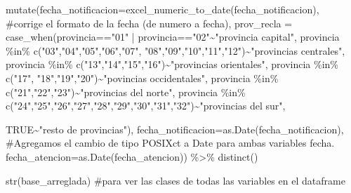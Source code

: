 \documentclass[
  letterpaper,
  DIV=11,
  numbers=noendperiod]{scrreprt}
\newenvironment{Shaded}{\begin{snugshade}}{\end{snugshade}}
\newcommand{\AttributeTok}[1]{\textcolor[rgb]{0.40,0.45,0.13}{#1}}
\newcommand{\CommentTok}[1]{\textcolor[rgb]{0.37,0.37,0.37}{#1}}
\newcommand{\ConstantTok}[1]{\textcolor[rgb]{0.56,0.35,0.01}{#1}}
\newcommand{\FunctionTok}[1]{\textcolor[rgb]{0.28,0.35,0.67}{#1}}
\newcommand{\NormalTok}[1]{\textcolor[rgb]{0.00,0.23,0.31}{#1}}
\newcommand{\SpecialCharTok}[1]{\textcolor[rgb]{0.37,0.37,0.37}{#1}}
\newcommand{\StringTok}[1]{\textcolor[rgb]{0.13,0.47,0.30}{#1}}
\begin{document}
\begin{Shaded}
\begin{Highlighting}[]
  \FunctionTok{mutate}\NormalTok{(}\AttributeTok{fecha\_notificacion=}\FunctionTok{excel\_numeric\_to\_date}\NormalTok{(fecha\_notificacion), }\CommentTok{\#corrige el formato de la fecha (de numero a fecha),}
   \AttributeTok{prov\_recla =} \FunctionTok{case\_when}\NormalTok{(provincia}\SpecialCharTok{==}\StringTok{"01"} \SpecialCharTok{|}\NormalTok{ provincia}\SpecialCharTok{==}\StringTok{"02"}\SpecialCharTok{\textasciitilde{}}\StringTok{"provincia capital"}\NormalTok{,}
\NormalTok{                          provincia }\SpecialCharTok{\%in\%} \FunctionTok{c}\NormalTok{(}\StringTok{"03"}\NormalTok{,}\StringTok{"04"}\NormalTok{,}\StringTok{"05"}\NormalTok{,}\StringTok{"06"}\NormalTok{,}\StringTok{"07"}\NormalTok{,}
                                           \StringTok{"08"}\NormalTok{,}\StringTok{"09"}\NormalTok{,}\StringTok{"10"}\NormalTok{,}\StringTok{"11"}\NormalTok{,}\StringTok{"12"}\NormalTok{)}\SpecialCharTok{\textasciitilde{}}\StringTok{"provincias centrales"}\NormalTok{, }
\NormalTok{                          provincia }\SpecialCharTok{\%in\%} \FunctionTok{c}\NormalTok{(}\StringTok{"13"}\NormalTok{,}\StringTok{"14"}\NormalTok{,}\StringTok{"15"}\NormalTok{,}\StringTok{"16"}\NormalTok{)}\SpecialCharTok{\textasciitilde{}}\StringTok{"provincias orientales"}\NormalTok{,}
\NormalTok{                          provincia }\SpecialCharTok{\%in\%} \FunctionTok{c}\NormalTok{(}\StringTok{"17"}\NormalTok{, }\StringTok{"18"}\NormalTok{,}\StringTok{"19"}\NormalTok{,}\StringTok{"20"}\NormalTok{)}\SpecialCharTok{\textasciitilde{}}\StringTok{"povincias occidentales"}\NormalTok{,}
\NormalTok{                          provincia }\SpecialCharTok{\%in\%} \FunctionTok{c}\NormalTok{(}\StringTok{"21"}\NormalTok{,}\StringTok{"22"}\NormalTok{,}\StringTok{"23"}\NormalTok{)}\SpecialCharTok{\textasciitilde{}}\StringTok{"provincias del norte"}\NormalTok{,}
\NormalTok{                          provincia }\SpecialCharTok{\%in\%} \FunctionTok{c}\NormalTok{(}\StringTok{"24"}\NormalTok{,}\StringTok{"25"}\NormalTok{,}\StringTok{"26"}\NormalTok{,}\StringTok{"27"}\NormalTok{,}\StringTok{"28"}\NormalTok{,}\StringTok{"29"}\NormalTok{,}\StringTok{"30"}\NormalTok{,}\StringTok{"31"}\NormalTok{,}\StringTok{"32"}\NormalTok{)}\SpecialCharTok{\textasciitilde{}}\StringTok{"provincias del sur"}\NormalTok{,}
                          
                          \ConstantTok{TRUE}\SpecialCharTok{\textasciitilde{}}\StringTok{"resto de provincias"}\NormalTok{),}
         \AttributeTok{fecha\_notificacion=}\FunctionTok{as.Date}\NormalTok{(fecha\_notificacion), }\CommentTok{\#Agregamos el cambio de tipo POSIXct a Date para ambas variables fecha.}
         \AttributeTok{fecha\_atencion=}\FunctionTok{as.Date}\NormalTok{(fecha\_atencion)) }\SpecialCharTok{\%\textgreater{}\%} 
  \FunctionTok{distinct}\NormalTok{()}
  
  \FunctionTok{str}\NormalTok{(base\_arreglada) }\CommentTok{\#para ver las clases de todas las variables en el dataframe}
\end{Highlighting}
\end{Shaded}
\end{document}

